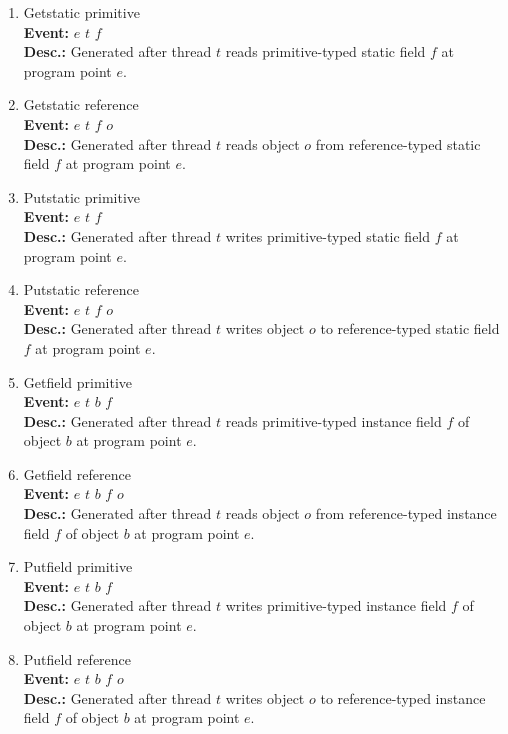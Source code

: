 \begin{enumerate}
\item
Getstatic primitive \\
{\bf Event:}  $e$ $t$ $f$ \\
{\bf Desc.:} Generated after thread $t$ reads primitive-typed static field $f$ at program point $e$.

\item
Getstatic reference \\
{\bf Event:}  $e$ $t$ $f$ $o$ \\
{\bf Desc.:} Generated after thread $t$ reads object $o$ from reference-typed static field $f$ at program point $e$.

\item
Putstatic primitive \\
{\bf Event:}  $e$ $t$ $f$ \\
{\bf Desc.:} Generated after thread $t$ writes primitive-typed static field $f$ at program point $e$.

\item
Putstatic reference \\
{\bf Event:}  $e$ $t$ $f$ $o$ \\
{\bf Desc.:} Generated after thread $t$ writes object $o$ to reference-typed static field $f$ at program point $e$.

\item
Getfield primitive \\
{\bf Event:}  $e$ $t$ $b$ $f$ \\
{\bf Desc.:} Generated after thread $t$ reads primitive-typed instance field $f$ of object $b$ at program point $e$.

\item
Getfield reference \\
{\bf Event:}  $e$ $t$ $b$ $f$ $o$ \\
{\bf Desc.:} Generated after thread $t$ reads object $o$ from reference-typed instance field $f$ of object $b$ at program point $e$.

\item
Putfield primitive \\
{\bf Event:}  $e$ $t$ $b$ $f$ \\
{\bf Desc.:} Generated after thread $t$ writes primitive-typed instance field $f$ of object $b$ at program point $e$.

\item
Putfield reference \\
{\bf Event:}  $e$ $t$ $b$ $f$ $o$ \\
{\bf Desc.:} Generated after thread $t$ writes object $o$ to reference-typed instance field $f$ of object $b$ at program point $e$.


\end{enumerate}
